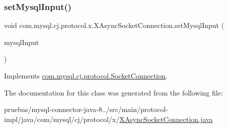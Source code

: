 \mbox{\label{classcom_1_1mysql_1_1cj_1_1protocol_1_1x_1_1_x_async_socket_connection_af5b71958ccff270ccc3a24afa1b3a0af}} 
\subsubsection{\texorpdfstring{set\+Mysql\+Input()}{setMysqlInput()}}
{\footnotesize\ttfamily void com.\+mysql.\+cj.\+protocol.\+x.\+X\+Async\+Socket\+Connection.\+set\+Mysql\+Input (\begin{DoxyParamCaption}\item[{Input\+Stream}]{mysql\+Input }\end{DoxyParamCaption})}



Implements \mbox{\hyperlink{interfacecom_1_1mysql_1_1cj_1_1protocol_1_1_socket_connection_a0b307f24afb5f5e1090f2b2f99f13cf5}{com.\+mysql.\+cj.\+protocol.\+Socket\+Connection}}.



The documentation for this class was generated from the following file\+:\begin{DoxyCompactItemize}
\item 
pruebas/mysql-\/connector-\/java-\/8../src/main/protocol-\/impl/java/com/mysql/cj/protocol/x/\mbox{\hyperlink{_x_async_socket_connection_8java}{X\+Async\+Socket\+Connection.\+java}}\end{DoxyCompactItemize}
